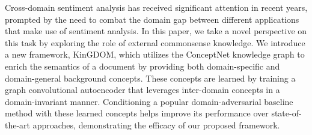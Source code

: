 Cross-domain sentiment analysis has received significant attention in recent years, prompted by the need to combat the domain gap between different applications that make use of sentiment analysis. In this paper, we take a novel perspective on this task by exploring the role of external commonsense knowledge. We introduce a new framework, KinGDOM, which utilizes the ConceptNet knowledge graph to enrich the semantics of a document by providing both domain-specific and domain-general background concepts. These concepts are learned by training a graph convolutional autoencoder that leverages inter-domain concepts in a domain-invariant manner. Conditioning a popular domain-adversarial baseline method with these learned concepts helps improve its performance over state-of-the-art approaches, demonstrating the efficacy of our proposed framework.
